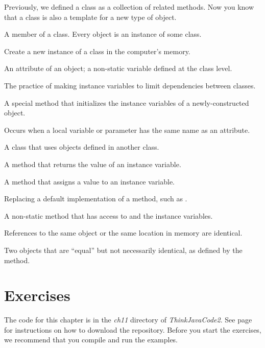 \begin{description}

Previously, we defined a class as a collection of related methods.
Now you know that a class is also a template for a new type of object.

A member of a class.
Every object is an instance of some class.

Create a new instance of a class in the computer's memory.


An attribute of an object; a non-static variable defined at the class level.

The practice of making instance variables  to limit dependencies between classes.

A special method that initializes the instance variables of a newly-constructed object.

Occurs when a local variable or parameter has the same name as an attribute.

A class that uses objects defined in another class.

A method that returns the value of an instance variable.

A method that assigns a value to an instance variable.

Replacing a default implementation of a method, such as .

A non-static method that has access to  and the instance variables.

References to the same object or the same location in memory are identical.

Two objects that are ``equal'' but not necessarily identical, as defined by the  method.

\end{description}


\section{Exercises}

The code for this chapter is in the {\it ch11} directory of {\it ThinkJavaCode2}.
See page~\pageref{code} for instructions on how to download the repository.
Before you start the exercises, we recommend that you compile and run the examples.


